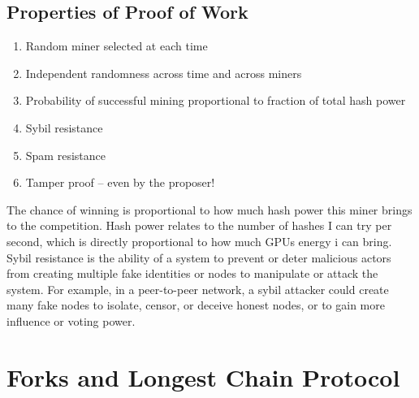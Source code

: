 \documentclass{report}
\begin{document}
\subsection*{Properties of Proof of Work}
\begin{enumerate}
	\item Random miner selected at each time
	\item Independent randomness across time and across miners
	\item Probability of successful mining proportional to fraction of total hash power
	\item Sybil resistance
	\item Spam resistance
	\item Tamper proof – even by the proposer!
\end{enumerate}
The chance of winning is proportional to how much hash power this miner brings to the competition. Hash power relates to the number of hashes I can try per second, which is directly proportional to how much GPUs energy i can bring.\\
Sybil resistance is the ability of a system to prevent or deter malicious actors from creating multiple fake identities or nodes to manipulate or attack the system. For example, in a peer-to-peer network, a sybil attacker could create many fake nodes to isolate, censor, or deceive honest nodes, or to gain more influence or voting power.

\section{Forks and Longest Chain Protocol}
\end{document}
